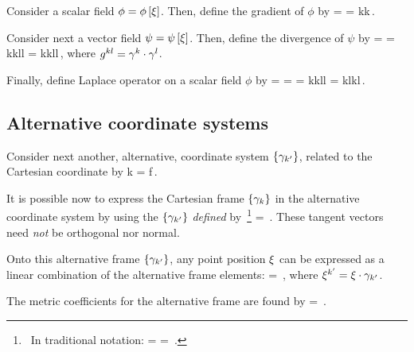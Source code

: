 Consider a scalar field $\phi = \phi\left[{\xi}\right]$. Then, define the gradient of $\phi$ by
\beq
\grad\phi = \gder\phi 
          = \rbvec k\igder k\phi\,.
\eeq

Consider next a vector field $\psi = \psi\left[{\xi}\right]$. Then, define the divergence of $\psi$ by
\beq
\div\psi = \gder\iprod\psi 
         = \rbvec k\igder k\iprod\rbvec l\rvec\psi l 
         = \ipd k\rmet kl\rvec\psi l\,,
\eeq
where $g^{{k}{l}} = \gamma^{k}\cdot\gamma^{l}$.

Finally, define Laplace operator on a scalar field $\phi$ by
\beq
\lap\phi = \div\grad\phi 
         = \gder\iprod\gder\phi
         = \rbvec k\igder k\iprod\rbvec l\igder l\phi
         = \igder k\igder l\rmet kl\phi\,.
\eeq


\subsection{Alternative coordinate systems}
Consider next another, alternative, coordinate system $\left\lbrace{\gamma_{k'}}\right\rbrace$, related to the Cartesian coordinate by
\beq
\fvec\pos k = f\,.
\eeq

It is possible now to express the Cartesian frame $\left\lbrace{\gamma_{k}}\right\rbrace$ in the alternative coordinate system by using the  $\left\lbrace{\gamma_{k'}}\right\rbrace$ \emph{defined} by~\footnote{~In traditional notation:
\beq
{} =  = \,.
\eeq}
\beq
{} = \pos\,.
\eeq
These tangent vectors need \emph{not} be orthogonal nor normal.

Onto this alternative frame $\left\lbrace{\gamma_{k'}}\right\rbrace$, any point position $\xi$ can be expressed as a linear combination of the alternative frame elements:
\beq
\pos = \fvec{}\,,
\eeq
where ${\xi}^{k'} = \xi\cdot\gamma_{k'}$.

The metric coefficients for the alternative frame are found by
\beq
{} = \iprod{}\,.
\eeq

